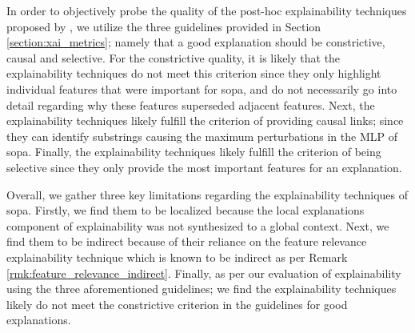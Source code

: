 In order to objectively probe the quality of the post-hoc explainability
techniques proposed by \citet{schwartz2018sopa}, we utilize the three guidelines
provided in Section \ref{section:xai_metrics}; namely that a good explanation
should be constrictive, causal and selective. For the constrictive quality, it
is likely that the explainability techniques do not meet this criterion since
they only highlight individual features that were important for \ac{sopa}, and
do not necessarily go into detail regarding why these features superseded
adjacent features. Next, the explainability techniques likely fulfill the
criterion of providing causal links; since they can identify substrings causing
the maximum perturbations in the MLP of \ac{sopa}. Finally, the explainability
techniques likely fulfill the criterion of being selective since they only
provide the most important features for an explanation.

Overall, we gather three key limitations regarding the explainability techniques
of \ac{sopa}. Firstly, we find them to be localized because the local
explanations component of explainability was not synthesized to a global
context. Next, we find them to be indirect because of their reliance on the
feature relevance explainability technique which is known to be indirect as per
Remark \ref{rmk:feature_relevance_indirect}. Finally, as per our evaluation of
explainability using the three aforementioned guidelines; we find the
explainability techniques likely do not meet the constrictive criterion in the
guidelines for good explanations.



